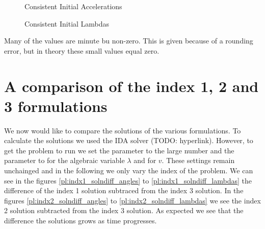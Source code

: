 \documentclass{report}
\begin{document}
\begin{figure}[h]
\centering

\caption{Consistent Initial Accelerations}
\end{figure}

\begin{figure}[h]
\centering

\caption{Consistent Initial Lambdas}
\end{figure}

Many of the values are minute bu non-zero. This is given because of a rounding error, but in theory these small values equal zero.

\section*{A comparison of the index 1, 2 and 3 formulations}

We now would like to compare the solutions of the various formulations. To calculate the solutions we used the IDA solver (TODO: hyperlink). However, to get the problem to run we set the  parameter to the large number  and the  parameter to  for the algebraic variable $\lambda$ and for $v$. These settings remain unchainged and in the following we only vary the index of the problem. We can see in the figures \ref{pl:indx1_solndiff_angles} to \ref{pl:indx1_solndiff_lambdas} the difference of the index 1 solution subtraced from the index 3 solution. In the figures \ref{pl:indx2_solndiff_angles} to \ref{pl:indx2_solndiff_lambdas} we see the index 2 solution subtracted from the index 3 solution. As expected we see that the difference the solutions grows as time progresses.
\end{document}
